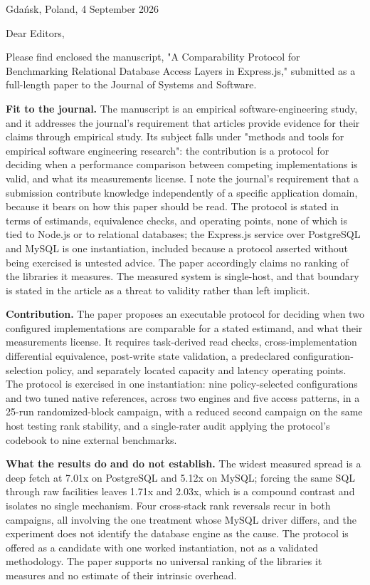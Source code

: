 \documentclass[11pt,a4paper]{article}
\begin{document}
Gdańsk, Poland, 4 September 2026

Dear Editors,

Please find enclosed the manuscript, "A Comparability Protocol for Benchmarking Relational Database Access Layers in Express.js," submitted as a full-length paper to the Journal of Systems and Software.

\textbf{Fit to the journal.} The manuscript is an empirical software-engineering study, and it addresses the journal's requirement that articles provide evidence for their claims through empirical study. Its subject falls under "methods and tools for empirical software engineering research": the contribution is a protocol for deciding when a performance comparison between competing implementations is valid, and what its measurements license. I note the journal's requirement that a submission contribute knowledge independently of a specific application domain, because it bears on how this paper should be read. The protocol is stated in terms of estimands, equivalence checks, and operating points, none of which is tied to Node.js or to relational databases; the Express.js service over PostgreSQL and MySQL is one instantiation, included because a protocol asserted without being exercised is untested advice. The paper accordingly claims no ranking of the libraries it measures. The measured system is single-host, and that boundary is stated in the article as a threat to validity rather than left implicit.

\textbf{Contribution.} The paper proposes an executable protocol for deciding when two configured implementations are comparable for a stated estimand, and what their measurements license. It requires task-derived read checks, cross-implementation differential equivalence, post-write state validation, a predeclared configuration-selection policy, and separately located capacity and latency operating points. The protocol is exercised in one instantiation: nine policy-selected configurations and two tuned native references, across two engines and five access patterns, in a 25-run randomized-block campaign, with a reduced second campaign on the same host testing rank stability, and a single-rater audit applying the protocol's codebook to nine external benchmarks.

\textbf{What the results do and do not establish.} The widest measured spread is a deep fetch at 7.01x on PostgreSQL and 5.12x on MySQL; forcing the same SQL through raw facilities leaves 1.71x and 2.03x, which is a compound contrast and isolates no single mechanism. Four cross-stack rank reversals recur in both campaigns, all involving the one treatment whose MySQL driver differs, and the experiment does not identify the database engine as the cause. The protocol is offered as a candidate with one worked instantiation, not as a validated methodology. The paper supports no universal ranking of the libraries it measures and no estimate of their intrinsic overhead.
\end{document}
